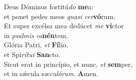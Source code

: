 \oddverse Deus Dóminus fortitú\textit{do} \textbf{me}a:~\*\\
\oddverse et ponet pedes meos \textit{qua}\textit{si} \textit{cer}\textbf{vó}rum.\\
\evenverse Et super excélsa mea dedúcet \textit{me} \textbf{vi}ctor~\*\\
\evenverse in \textit{psal}\textit{mis} \textit{ca}\textbf{nén}tem.\\
\oddverse Glória Patri, \textit{et} \textbf{Fí}lio,~\*\\
\oddverse et Spi\textit{rí}\textit{tu}\textit{i} \textbf{San}cto.\\
\evenverse Sicut erat in princípio, et nunc, \textit{et} \textbf{sem}per,~\*\\
\evenverse et in sǽcula sæ\textit{cu}\textit{ló}\textit{rum}. \textbf{A}men.\\
